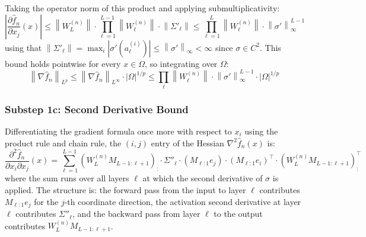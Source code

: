 \documentclass[12pt]{article}
\newcommand{\norm}[1]{\left\| #1 \right\|}
\newcommand{\fn}{\hat{f}_n}
\newcommand{\abs}[1]{\left| #1 \right|}
\begin{document}
	Taking the operator norm of this product and applying submultiplicativity:
	\begin{equation}
		\abs{\frac{\partial \fn}{\partial x_j}(x)}
		\leq \norm{W_L^{(n)}} \cdot \prod_{\ell=1}^{L-1}
		\norm{W_\ell^{(n)}} \cdot \norm{\Sigma'_\ell}
		\leq \prod_{\ell=1}^{L} \norm{W_\ell^{(n)}} \cdot \norm{\sigma'}_\infty^{L-1}
	\end{equation}
	using that $\norm{\Sigma'_\ell} = \max_i |\sigma'(a_\ell^{(i)})| \leq
	\norm{\sigma'}_\infty < \infty$ since $\sigma \in C^2$. This bound holds
	pointwise for every $x \in \Omega$, so integrating over $\Omega$:
	\begin{equation}
		\norm{\nabla \fn}_{L^p}
		\leq \norm{\nabla \fn}_{L^\infty} \cdot |\Omega|^{1/p}
		\leq \prod_\ell \norm{W_\ell^{(n)}} \cdot \norm{\sigma'}_\infty^{L-1}
		\cdot |\Omega|^{1/p}
	\end{equation}
	
	\subsubsection*{Substep 1c: Second Derivative Bound}
	
	Differentiating the gradient formula once more with respect to $x_i$ using
	the product rule and chain rule, the $(i,j)$ entry of the Hessian
	$\nabla^2 \fn(x)$ is:
	\begin{equation}
		\frac{\partial^2 \fn}{\partial x_i \partial x_j}(x)
		= \sum_{\ell=1}^{L-1}
		\left(W_L^{(n)} M_{L-1:\ell+1}\right)_{:}
		\cdot \Sigma''_\ell \cdot
		\left(M_{\ell:1} e_j\right) \cdot
		\left(M_{\ell:1} e_i\right)^\top \cdot
		\left(W_L^{(n)} M_{L-1:\ell+1}\right)_{:}^\top
	\end{equation}
	where the sum runs over all layers $\ell$ at which the second derivative of
	$\sigma$ is applied. The structure is: the forward pass from the input to
	layer $\ell$ contributes $M_{\ell:1} e_j$ for the $j$-th coordinate
	direction, the activation second derivative at layer $\ell$ contributes
	$\Sigma''_\ell$, and the backward pass from layer $\ell$ to the output
	contributes $W_L^{(n)} M_{L-1:\ell+1}$.
	
\end{document}
